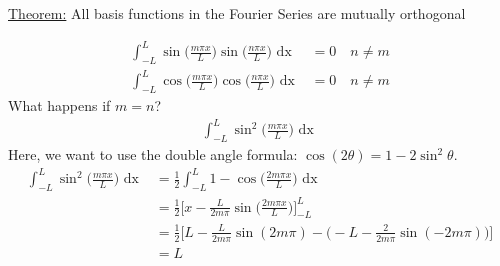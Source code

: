 \documentclass{article}
\newcommand{\dx}{\text{ dx }}
\newcommand{\thm}{\underline{Theorem:} }
\newcommand{\FS}{\sin \Big( \frac{n \pi x}{L} \Big)}
\newcommand{\FC}{\cos \Big( \frac{n \pi x}{L} \Big)}
\begin{document}
  \thm All basis functions in the Fourier Series are mutually orthogonal

  \begin{align}
    \int^L_{-L} \sin\Big(\frac{m \pi x}{L}\Big) \FS \dx & = 0 \quad n \neq m\\
    \int^L_{-L} \cos\Big(\frac{m \pi x}{L}\Big) \FC \dx & = 0 \quad n \neq m
  \end{align}
  What happens if $m = n$?
  \begin{align}
    \int^L_{-L} \sin^2\Big( \frac{m \pi x}{L} \Big) \dx
  \end{align}
  Here, we want to use the double angle formula: $\cos(2\theta) = 1 - 2\sin^2 \theta$.
  \begin{align}
    \int^L_{-L} \sin^2\Big( \frac{m \pi x}{L} \Big) \dx & =
    \frac{1}{2} \int^L_{-L} 1 - \cos\Big(\frac{2 m \pi x}{L}\Big) \dx\\ & =
    \frac{1}{2} \Big[ x - \frac{L}{2 m \pi}\sin\Big(\frac{2 m \pi x}{L}\Big)\Big]^L_{-L}\\ & =
    \frac{1}{2} \Big[L - \frac{L}{2 m \pi} \sin(2 m \pi) - \Big(-L - \frac{2}{2 m \pi} \sin(-2 m \pi)\Big)\Big]\\ & =
    L
  \end{align}
\end{document}
